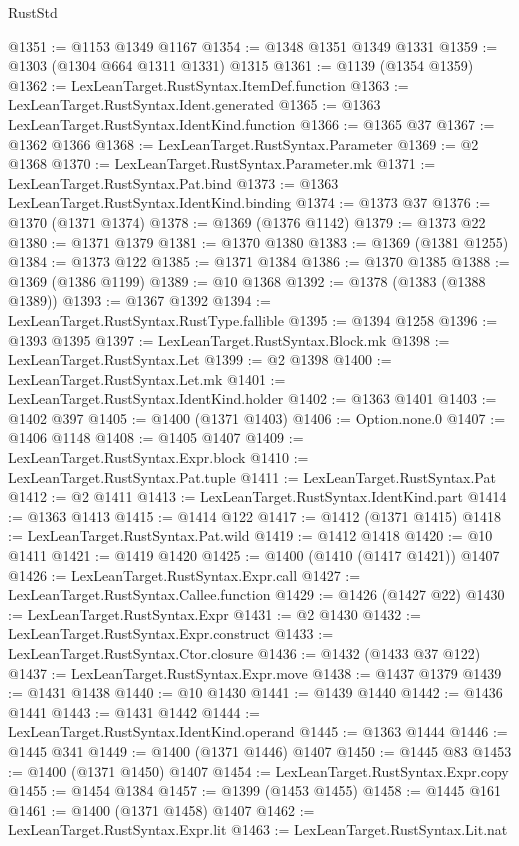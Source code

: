 \begin{lexlean}{RustStd}
\begin{coremodule}
@1351 := @1153 @1349 @1167
@1354 := @1348 @1351 @1349 @1331
@1359 := @1303 (@1304 @664 @1311 @1331) @1315
@1361 := @1139 (@1354 @1359)
@1362 := LexLeanTarget.RustSyntax.ItemDef.function
@1363 := LexLeanTarget.RustSyntax.Ident.generated
@1365 := @1363 LexLeanTarget.RustSyntax.IdentKind.function
@1366 := @1365 @37
@1367 := @1362 @1366
@1368 := LexLeanTarget.RustSyntax.Parameter
@1369 := @2 @1368
@1370 := LexLeanTarget.RustSyntax.Parameter.mk
@1371 := LexLeanTarget.RustSyntax.Pat.bind
@1373 := @1363 LexLeanTarget.RustSyntax.IdentKind.binding
@1374 := @1373 @37
@1376 := @1370 (@1371 @1374)
@1378 := @1369 (@1376 @1142)
@1379 := @1373 @22
@1380 := @1371 @1379
@1381 := @1370 @1380
@1383 := @1369 (@1381 @1255)
@1384 := @1373 @122
@1385 := @1371 @1384
@1386 := @1370 @1385
@1388 := @1369 (@1386 @1199)
@1389 := @10 @1368
@1392 := @1378 (@1383 (@1388 @1389))
@1393 := @1367 @1392
@1394 := LexLeanTarget.RustSyntax.RustType.fallible
@1395 := @1394 @1258
@1396 := @1393 @1395
@1397 := LexLeanTarget.RustSyntax.Block.mk
@1398 := LexLeanTarget.RustSyntax.Let
@1399 := @2 @1398
@1400 := LexLeanTarget.RustSyntax.Let.mk
@1401 := LexLeanTarget.RustSyntax.IdentKind.holder
@1402 := @1363 @1401
@1403 := @1402 @397
@1405 := @1400 (@1371 @1403)
@1406 := Option.none.{0}
@1407 := @1406 @1148
@1408 := @1405 @1407
@1409 := LexLeanTarget.RustSyntax.Expr.block
@1410 := LexLeanTarget.RustSyntax.Pat.tuple
@1411 := LexLeanTarget.RustSyntax.Pat
@1412 := @2 @1411
@1413 := LexLeanTarget.RustSyntax.IdentKind.part
@1414 := @1363 @1413
@1415 := @1414 @122
@1417 := @1412 (@1371 @1415)
@1418 := LexLeanTarget.RustSyntax.Pat.wild
@1419 := @1412 @1418
@1420 := @10 @1411
@1421 := @1419 @1420
@1425 := @1400 (@1410 (@1417 @1421)) @1407
@1426 := LexLeanTarget.RustSyntax.Expr.call
@1427 := LexLeanTarget.RustSyntax.Callee.function
@1429 := @1426 (@1427 @22)
@1430 := LexLeanTarget.RustSyntax.Expr
@1431 := @2 @1430
@1432 := LexLeanTarget.RustSyntax.Expr.construct
@1433 := LexLeanTarget.RustSyntax.Ctor.closure
@1436 := @1432 (@1433 @37 @122)
@1437 := LexLeanTarget.RustSyntax.Expr.move
@1438 := @1437 @1379
@1439 := @1431 @1438
@1440 := @10 @1430
@1441 := @1439 @1440
@1442 := @1436 @1441
@1443 := @1431 @1442
@1444 := LexLeanTarget.RustSyntax.IdentKind.operand
@1445 := @1363 @1444
@1446 := @1445 @341
@1449 := @1400 (@1371 @1446) @1407
@1450 := @1445 @83
@1453 := @1400 (@1371 @1450) @1407
@1454 := LexLeanTarget.RustSyntax.Expr.copy
@1455 := @1454 @1384
@1457 := @1399 (@1453 @1455)
@1458 := @1445 @161
@1461 := @1400 (@1371 @1458) @1407
@1462 := LexLeanTarget.RustSyntax.Expr.lit
@1463 := LexLeanTarget.RustSyntax.Lit.nat

\end{coremodule}
\end{lexlean}
